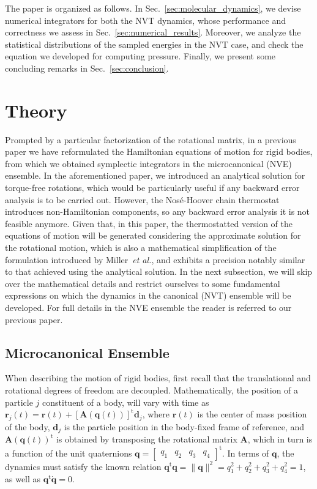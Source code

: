 \documentclass[aip,jcp,reprint,amsmath,amssymb]{revtex4-1}
\newcommand{\mt}[1]{\boldsymbol{\mathbf{#1}}}           %
\newcommand{\vt}[1]{\boldsymbol{\mathbf{#1}}}           %
\newcommand{\tr}[1]{#1^\text{t}}                        %
\begin{document}
The paper is organized as follows. In Sec.~\ref{sec:molecular_dynamics}, we devise numerical integrators for both the NVT dynamics, whose performance and correctness we assess in Sec.~\ref{sec:numerical_results}. Moreover, we analyze the statistical distributions of the sampled energies in the NVT case, and check the equation we developed for computing pressure. Finally, we present some concluding remarks in Sec.~\ref{sec:conclusion}.

\section{Theory}

Prompted by a particular factorization of the rotational matrix, in a previous paper\cite{Abreu_2017} we have reformulated the Hamiltonian equations of motion for rigid bodies, from which we obtained symplectic integrators in the microcanonical (NVE) ensemble. In the aforementioned paper, we introduced an analytical solution for torque-free rotations, which would be particularly useful if any backward error analysis\cite{Hairer_2006} is to be carried out. However, the  Nos\'{e}-Hoover chain thermostat introduces non-Hamiltonian components, so any backward error analysis it is not feasible anymore. Given that, in this paper, the thermostatted version of the equations of motion will be generated considering the approximate solution for the rotational motion, which is also a mathematical simplification of the formulation introduced by Miller~\textit{et al.}\cite{Miller2002}, and exhibits a precision notably similar to that achieved using the analytical solution. In the next subsection, we will skip over the mathematical details and restrict ourselves to some fundamental expressions on which the dynamics in the canonical (NVT) ensemble will be developed. For full details in the NVE ensemble the reader is referred to our previous paper.\cite{Abreu_2017}

\subsection{Microcanonical Ensemble}

When describing the motion of rigid bodies, first recall that the translational and rotational degrees of freedom are decoupled. Mathematically, the position of a particle $j$ constituent of a body, will vary with time as $\vt r_j(t) = \vt r(t) + \tr{[{\mt A}(\vt q(t))]}\vt d_j$, where $\vt r(t)$ is the center of mass position of the body, $\vt d_j$ is the particle position in the body-fixed frame of reference, and $\tr{\mt A(\vt q(t))}$ is obtained by transposing the rotational matrix $\mt A$, which in turn is a function of the unit quaternions $\vt q = \tr {[\begin{array}{cccc} q_1 & q_2 & q_3 & q_4 \end{array}]}$. In terms of $\vt q$, the dynamics must satisfy the known relation\cite{Goldstein2002} $\tr{\vt q}{\vt q} = \|\vt q\|^2 = q_1^2 + q_2^2 + q_3^2 + q_4^2 = 1$, as well as $\tr{\vt q}{\dot{\vt q}} = 0$.
\end{document}
